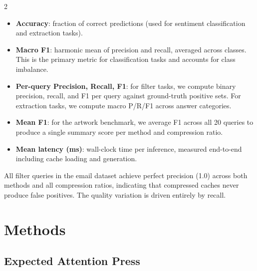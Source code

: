 \documentclass[10pt,a4paper]{article}
\begin{document}
\begin{multicols}{2}
\begin{itemize}
  \item \textbf{Accuracy}: fraction of correct predictions (used for
    sentiment classification and extraction tasks).
  \item \textbf{Macro F1}: harmonic mean of precision and recall, averaged
    across classes. This is the primary metric for classification tasks
    and accounts for class imbalance.
  \item \textbf{Per-query Precision, Recall, F1}: for filter tasks, we
    compute binary precision, recall, and F1 per query against
    ground-truth positive sets. For extraction tasks, we compute macro
    P/R/F1 across answer categories.
  \item \textbf{Mean F1}: for the artwork benchmark, we average F1 across
    all 20 queries to produce a single summary score per method and
    compression ratio.
  \item \textbf{Mean latency (ms)}: wall-clock time per inference,
    measured end-to-end including cache loading and generation.
\end{itemize}

All filter queries in the email dataset achieve perfect precision (1.0)
across both methods and all compression ratios, indicating that compressed
caches never produce false positives. The quality variation is driven
entirely by recall.

\begin{center}
  \centering
  \fbox{\rule{0pt}{3.2cm}\rule{0.9\columnwidth}{0pt}}
  \label{fig:dataset-binary}
\end{center}

\begin{center}
  \centering
  \fbox{\rule{0pt}{4cm}\rule{0.9\columnwidth}{0pt}}
  \label{fig:wide-distribution}
\end{center}

\section{Methods}

\subsection{Expected Attention Press}


\end{multicols}
\end{document}
